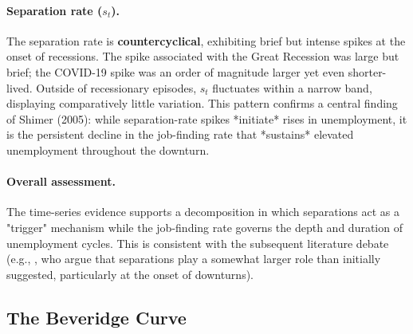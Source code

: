 \documentclass[dvipsnames,11pt]{article}
\begin{document}
\begin{enumerate}
\begin{solution}
                    \paragraph{Separation rate ($s_t$).}

                        The separation rate is \textbf{countercyclical}, exhibiting brief but intense spikes at the onset of recessions. The spike associated with the Great Recession was large but brief; the COVID-19 spike was an order of magnitude larger yet even shorter-lived. Outside of recessionary episodes, $s_t$ fluctuates within a narrow band, displaying comparatively little variation. This pattern confirms a central finding of Shimer (2005): while separation-rate spikes *initiate* rises in unemployment, it is the persistent decline in the job-finding rate that *sustains* elevated unemployment throughout the downturn.

                    \paragraph{Overall assessment.}

                        The time-series evidence supports a decomposition in which separations act as a "trigger" mechanism while the job-finding rate governs the depth and duration of unemployment cycles. This is consistent with the subsequent literature debate (e.g., \textcite{elsby2009ins}, who argue that separations play a somewhat larger role than \textcite{shimer2005cyclical} initially suggested, particularly at the onset of downturns).
                    
                \end{solution}

            \end{enumerate}

    \subsection{The Beveridge Curve}
\end{document}

